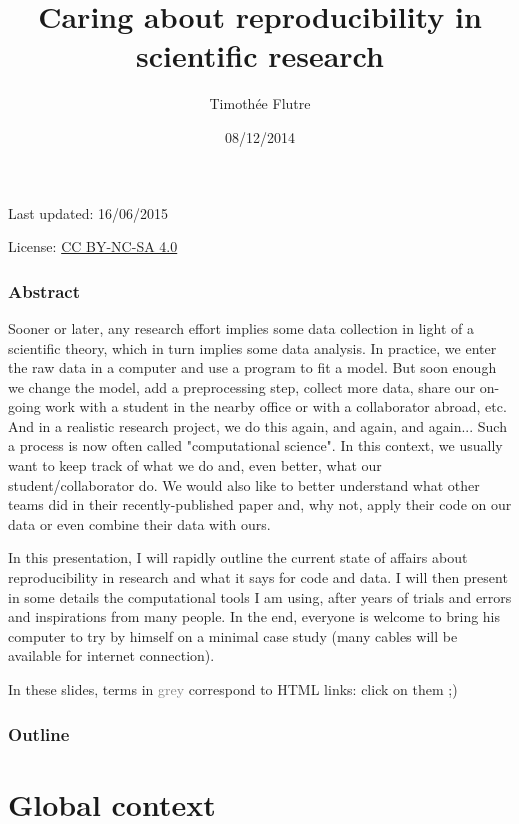 \documentclass[c]{beamer} %
\title[Reproducible research]{Caring about reproducibility in scientific research}
\author[T. Flutre]{Timoth\'{e}e Flutre}
\institute[INRA]{INRA, UMR AGAP}
\date{08/12/2014}
\begin{document}
\begin{frame}
  \titlepage
  
  \tiny
  \begin{center}
    Last updated: 16/06/2015
    
    \medskip
    
    License: \href{http://creativecommons.org/licenses/by-nc-sa/4.0/}{CC BY-NC-SA 4.0}
  \end{center}
\end{frame}                                                                                                                       
\begin{frame}
  \frametitle{Abstract}
  \tiny
  Sooner or later, any research effort implies some data collection in light of a scientific theory, which in turn implies some data analysis. In practice, we enter the raw data in a computer and use a program to fit a model. But soon enough we change the model, add a preprocessing step, collect more data, share our on-going work with a student in the nearby office or with a collaborator abroad, etc. And in a realistic research project, we do this again, and again, and again... Such a process is now often called "computational science". In this context, we usually want to keep track of what we do and, even better, what our student/collaborator do. We would also like to better understand what other teams did in their recently-published paper and, why not, apply their code on our data or even combine their data with ours.
  
  \medskip
  
  In this presentation, I will rapidly outline the current state of affairs about reproducibility in research and what it says for code and data. I will then present in some details the computational tools I am using, after years of trials and errors and inspirations from many people. In the end, everyone is welcome to bring his computer to try by himself on a minimal case study (many cables will be available for internet connection).
  
  \bigskip
  
  In these slides, terms in \textcolor{gray}{grey} correspond to HTML links: click on them ;)
\end{frame}

\begin{frame}
  \frametitle{Outline}
  \tableofcontents
\end{frame}

\section{Global context}
\end{document}
